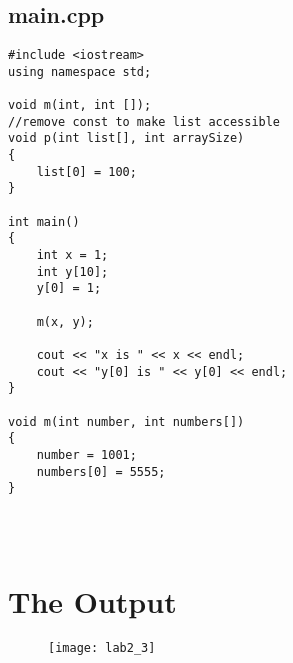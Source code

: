 \documentclass[11pt]{article}
\begin{document}
\subsection*{main.cpp}

\begin{lstlisting}
#include <iostream>
using namespace std;

void m(int, int []);
//remove const to make list accessible
void p(int list[], int arraySize)
{
    list[0] = 100;
}

int main()
{
    int x = 1;
    int y[10];
    y[0] = 1;

    m(x, y);

    cout << "x is " << x << endl;
    cout << "y[0] is " << y[0] << endl;
}

void m(int number, int numbers[])
{
    number = 1001;
    numbers[0] = 5555;
}
\end{lstlisting}

\subsection*{}
\begin{lstlisting}


\end{lstlisting}

\section*{The Output}

\begin{figure}[H]
    \centering
    \texttt{[image: lab2\_3]}
\end{figure}
\end{document}
